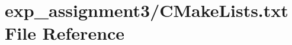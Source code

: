 \hypertarget{exp__assignment3_2CMakeLists_8txt}{}\section{exp\+\_\+assignment3/\+C\+Make\+Lists.txt File Reference}
\label{exp__assignment3_2CMakeLists_8txt}
